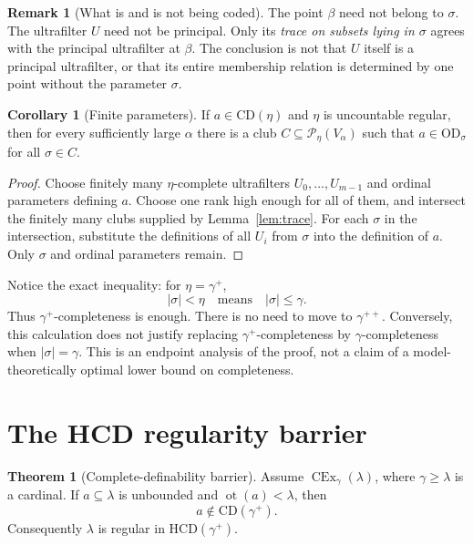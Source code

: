 \documentclass[11pt,letterpaper]{article}
\theoremstyle{definition}
\newtheorem{theorem}[definition]{Theorem}
\newtheorem{corollary}[definition]{Corollary}
\newcommand{\OD}{\mathrm{OD}}
\newcommand{\CEx}{\operatorname{CEx}}
\newcommand{\ot}{\operatorname{ot}}
\newcommand{\CD}{\mathrm{CD}}
\newcommand{\HCD}{\mathrm{HCD}}
\newcommand{\Pow}{\mathcal P}
\newtheorem{remark}[definition]{Remark}
\begin{document}
\begin{remark}[What is and is not being coded]\label{rem:trace}
The point $\beta$ need not belong to $\sigma$. The ultrafilter $U$ need not be
principal. Only its \emph{trace on subsets lying in $\sigma$} agrees with the
principal ultrafilter at $\beta$. The conclusion is not that $U$ itself is a
principal ultrafilter, or that its entire membership relation is determined
by one point without the parameter $\sigma$.
\end{remark}

\begin{corollary}[Finite parameters]\label{cor:finite}
If $a\in\CD(\eta)$ and $\eta$ is uncountable regular, then for every
sufficiently large $\alpha$ there is a club
$C\subseteq\Pow_\eta(V_\alpha)$ such that $a\in\OD_\sigma$ for all $\sigma\in C$.
\end{corollary}

\begin{proof}
Choose finitely many $\eta$-complete ultrafilters $U_0,\ldots,U_{m-1}$ and
ordinal parameters defining $a$. Choose one rank high enough for all of them,
and intersect the finitely many clubs supplied by Lemma~\ref{lem:trace}.
For each $\sigma$ in the intersection, substitute the definitions of all
$U_i$ from $\sigma$ into the definition of $a$. Only $\sigma$ and ordinal
parameters remain.
\end{proof}

Notice the exact inequality: for $\eta=\gamma^+$,
\[
 |\sigma|<\eta\quad\text{means}\quad |\sigma|\leq\gamma.
\]
Thus $\gamma^+$-completeness is enough. There is no need to move to
$\gamma^{++}$. Conversely, this calculation does not justify replacing
$\gamma^+$-completeness by $\gamma$-completeness when $|\sigma|=\gamma$.
This is an endpoint analysis of the proof, not a claim of a model-theoretically
optimal lower bound on completeness.

\section{The HCD regularity barrier}\label{sec:barrier}

\begin{theorem}[Complete-definability barrier]\label{thm:barrier}
Assume $\CEx_\gamma(\lambda)$, where $\gamma\geq\lambda$ is a cardinal.
If $a\subseteq\lambda$ is unbounded and $\ot(a)<\lambda$, then
\[
 a\notin\CD(\gamma^+).
\]
Consequently $\lambda$ is regular in $\HCD(\gamma^+)$.
\end{theorem}
\end{document}
